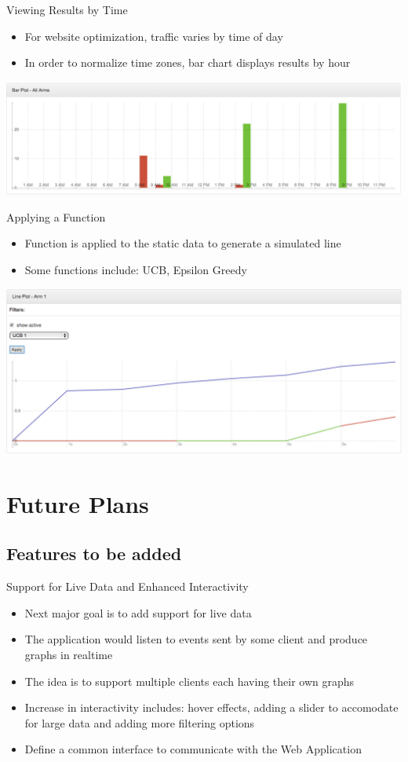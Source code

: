 \documentclass{beamer}
\begin{document}
\begin{frame}{Viewing Results by Time}
\begin{itemize}
\item For website optimization, traffic varies by time of day
\item In order to normalize time zones, bar chart displays results by hour
\end{itemize}
\includegraphics[scale=0.25]{barcharttime.png}
\end{frame}

\begin{frame}{Applying a Function}
\begin{itemize}
\item Function is applied to the static data to generate a simulated line
\item Some functions include: UCB, Epsilon Greedy
\end{itemize}
\includegraphics[scale=0.25]{linechartfunction.png}
\end{frame}

\section{Future Plans}

\subsection{Features to be added}
\begin{frame}{Support for Live Data and Enhanced Interactivity}
\begin{itemize}
\item Next major goal is to add support for live data
\item The application would listen to events sent by some client and produce graphs in realtime
\item The idea is to support multiple clients each having their own graphs
\item Increase in interactivity includes: hover effects, adding a slider to accomodate for large data and adding more filtering options
\item Define a common interface to communicate with the Web Application
\end{itemize}
\end{frame}
\end{document}
